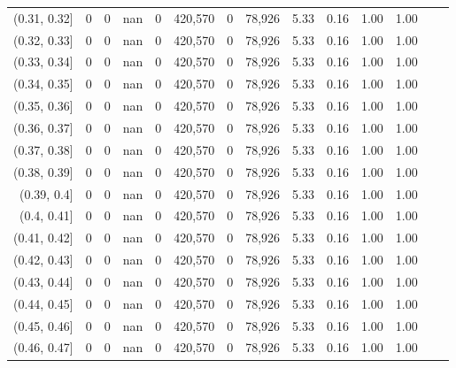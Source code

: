 \begin{tabular}{rrrrrrrrrrrrrr}
(0.31, 0.32]   &        0 &       0 &    nan &        0 &  420,570 &       0 &  78,926 &  5.33 &  0.16 &  1.00 &      1.00 \\
(0.32, 0.33]   &        0 &       0 &    nan &        0 &  420,570 &       0 &  78,926 &  5.33 &  0.16 &  1.00 &      1.00 \\
(0.33, 0.34]   &        0 &       0 &    nan &        0 &  420,570 &       0 &  78,926 &  5.33 &  0.16 &  1.00 &      1.00 \\
(0.34, 0.35]   &        0 &       0 &    nan &        0 &  420,570 &       0 &  78,926 &  5.33 &  0.16 &  1.00 &      1.00 \\
(0.35, 0.36]   &        0 &       0 &    nan &        0 &  420,570 &       0 &  78,926 &  5.33 &  0.16 &  1.00 &      1.00 \\
(0.36, 0.37]   &        0 &       0 &    nan &        0 &  420,570 &       0 &  78,926 &  5.33 &  0.16 &  1.00 &      1.00 \\
(0.37, 0.38]   &        0 &       0 &    nan &        0 &  420,570 &       0 &  78,926 &  5.33 &  0.16 &  1.00 &      1.00 \\
(0.38, 0.39]   &        0 &       0 &    nan &        0 &  420,570 &       0 &  78,926 &  5.33 &  0.16 &  1.00 &      1.00 \\
(0.39, 0.4]    &        0 &       0 &    nan &        0 &  420,570 &       0 &  78,926 &  5.33 &  0.16 &  1.00 &      1.00 \\
(0.4, 0.41]    &        0 &       0 &    nan &        0 &  420,570 &       0 &  78,926 &  5.33 &  0.16 &  1.00 &      1.00 \\
(0.41, 0.42]   &        0 &       0 &    nan &        0 &  420,570 &       0 &  78,926 &  5.33 &  0.16 &  1.00 &      1.00 \\
(0.42, 0.43]   &        0 &       0 &    nan &        0 &  420,570 &       0 &  78,926 &  5.33 &  0.16 &  1.00 &      1.00 \\
(0.43, 0.44]   &        0 &       0 &    nan &        0 &  420,570 &       0 &  78,926 &  5.33 &  0.16 &  1.00 &      1.00 \\
(0.44, 0.45]   &        0 &       0 &    nan &        0 &  420,570 &       0 &  78,926 &  5.33 &  0.16 &  1.00 &      1.00 \\
(0.45, 0.46]   &        0 &       0 &    nan &        0 &  420,570 &       0 &  78,926 &  5.33 &  0.16 &  1.00 &      1.00 \\
(0.46, 0.47]   &        0 &       0 &    nan &        0 &  420,570 &       0 &  78,926 &  5.33 &  0.16 &  1.00 &      1.00 \\

\end{tabular}
